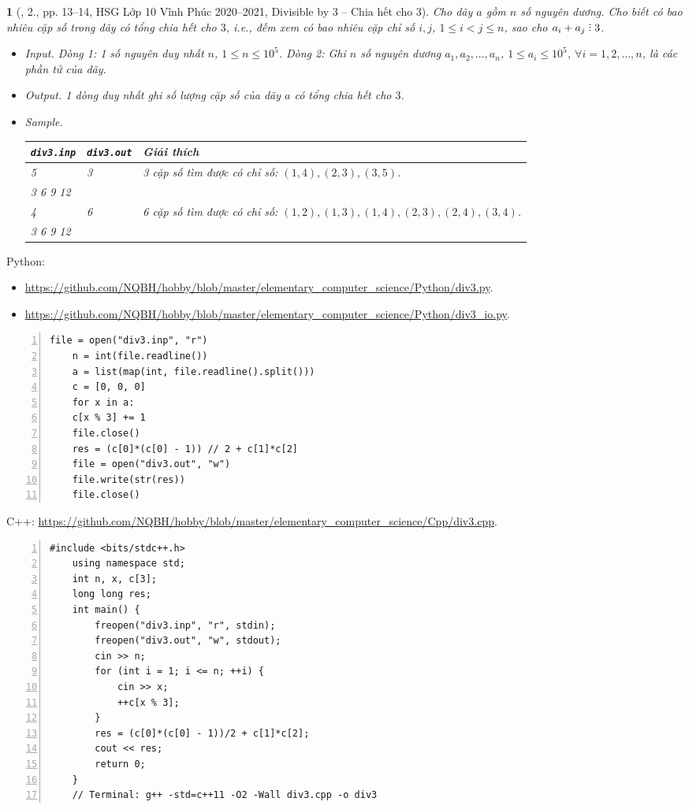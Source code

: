 \documentclass{article}
\newtheorem{baitoan}{}
\DeclareRobustCommand{\divby}{%
	\mathrel{\vbox{\baselineskip.65ex\lineskiplimit0pt\hbox{.}\hbox{.}\hbox{.}}}%
}
\begin{document}
\begin{baitoan}[\cite{Trung_HSG_THPT_Tin}, 2., pp. 13--14, HSG Lớp 10 Vĩnh Phúc 2020--2021, Divisible by 3 -- Chia hết cho 3]
	Cho dãy $a$ gồm $n$ số nguyên dương. Cho biết có bao nhiêu cặp số trong dãy có tổng chia hết cho $3$, i.e., đếm xem có bao nhiêu cặp chỉ số $i,j$, $1\le i < j\le n$, sao cho $a_i + a_j\divby3$.
	\begin{itemize}
		\item {\sf Input.} Dòng 1: 1 số nguyên duy nhất $n$, $1\le n\le10^5$. Dòng 2: Ghi $n$ số nguyên dương $a_1,a_2,\ldots,a_n$, $1\le a_i\le10^5$, $\forall i = 1,2,\ldots,n$, là các phần tử của dãy.
		\item {\sf Output.} 1 dòng duy nhất ghi số lượng cặp số của dãy $a$ có tổng chia hết cho $3$.
		\item {\sf Sample.}
		\begin{table}[H]
			\centering
			\begin{tabular}{|l|l|l|}
				\hline
				{\tt div3.inp} & {\tt div3.out} & Giải thích \\
				\hline
				5 & 3 & 3 cặp số tìm được có chỉ số: $(1,4),(2,3),(3,5)$. \\
				3 6 9 12 & & \\
				\hline
				4 & 6 & 6 cặp số tìm được có chỉ số: $(1,2),(1,3),(1,4),(2,3),(2,4),(3,4)$. \\
				3 6 9 12 & & \\
				\hline
			\end{tabular}
		\end{table}
	\end{itemize}
\end{baitoan}
Python:
\begin{itemize}
	\item \url{https://github.com/NQBH/hobby/blob/master/elementary_computer_science/Python/div3.py}.
	\item \url{https://github.com/NQBH/hobby/blob/master/elementary_computer_science/Python/div3_io.py}.
\end{itemize}
\begin{Verbatim}[numbers=left,xleftmargin=5mm]
	file = open("div3.inp", "r")
	n = int(file.readline())
	a = list(map(int, file.readline().split()))
	c = [0, 0, 0]
	for x in a:
	c[x % 3] += 1
	file.close()
	res = (c[0]*(c[0] - 1)) // 2 + c[1]*c[2]
	file = open("div3.out", "w")
	file.write(str(res))
	file.close()
\end{Verbatim}
C++: \url{https://github.com/NQBH/hobby/blob/master/elementary_computer_science/Cpp/div3.cpp}.
\begin{Verbatim}[numbers=left,xleftmargin=5mm]
	#include <bits/stdc++.h>
	using namespace std;
	int n, x, c[3];
	long long res;
	int main() {
		freopen("div3.inp", "r", stdin);
		freopen("div3.out", "w", stdout);
		cin >> n;
		for (int i = 1; i <= n; ++i) {
			cin >> x;
			++c[x % 3];
		}
		res = (c[0]*(c[0] - 1))/2 + c[1]*c[2];
		cout << res;
		return 0;
	}
	// Terminal: g++ -std=c++11 -O2 -Wall div3.cpp -o div3
\end{Verbatim}
\end{document}
